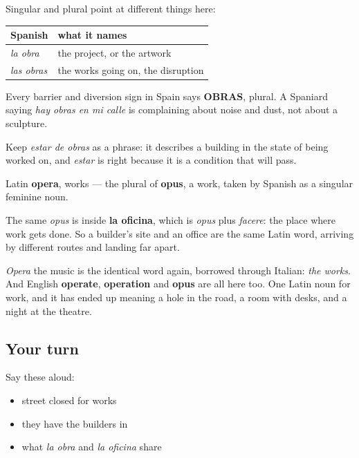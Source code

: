 \begin{grammarlens}[title={Grammar Lens: obras in the plural is the roadworks}]
Singular and plural point at different things here:

\noindent
\begin{tabularx}{\linewidth}{@{}>{\raggedright\arraybackslash}X>{\raggedright\arraybackslash}X@{}}
\toprule
\textbf{Spanish} & \textbf{what it names} \\
\midrule
\emph{la obra} & the project, or the artwork \\
\emph{las obras} & the works going on, the disruption \\
\bottomrule
\end{tabularx}

Every barrier and diversion sign in Spain says \textbf{OBRAS}, plural. A Spaniard saying \emph{hay obras en mi calle} is complaining about noise and dust, not about a sculpture.

Keep \emph{estar de obras} as a phrase: it describes a building in the state of being worked on, and \emph{estar} is right because it is a condition that will pass.
\end{grammarlens}

\begin{cousinweb}
Latin \textbf{opera}, works — the plural of \textbf{opus}, a work, taken by Spanish as a singular feminine noun.

The same \emph{opus} is inside \textbf{la oficina}, which is \emph{opus} plus \emph{facere}: the place where work gets done. So a builder's site and an office are the same Latin word, arriving by different routes and landing far apart.

\emph{Opera} the music is the identical word again, borrowed through Italian: \emph{the works}. And English \textbf{operate}, \textbf{operation} and \textbf{opus} are all here too. One Latin noun for work, and it has ended up meaning a hole in the road, a room with desks, and a night at the theatre.
\end{cousinweb}

\subsection*{Your turn}
Say these aloud:

\begin{itemize}
\raggedright
  \item street closed for works
  \item they have the builders in
  \item what \emph{la obra} and \emph{la oficina} share
\end{itemize}

